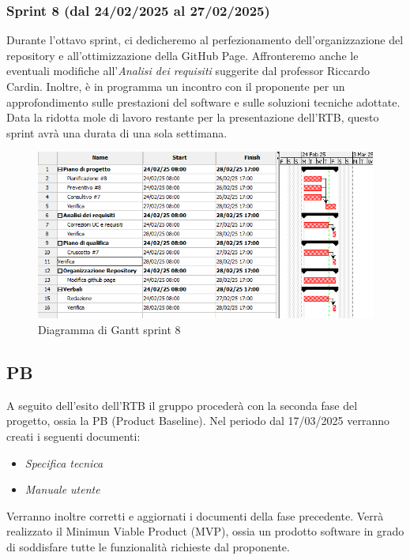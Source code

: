\subsubsection{Sprint 8 (dal 24/02/2025 al 27/02/2025)}
Durante l'ottavo sprint, ci dedicheremo al perfezionamento dell'organizzazione del repository e all'ottimizzazione della GitHub Page.
Affronteremo anche le eventuali modifiche all'\textit{Analisi dei requisiti} suggerite dal professor Riccardo Cardin.
Inoltre, è in programma un incontro con il proponente per un approfondimento sulle prestazioni del software e sulle soluzioni tecniche adottate.
Data la ridotta mole di lavoro restante per la presentazione dell'RTB, questo sprint avrà una durata di una sola settimana.

\begin{figure}[h!]
    \centering
    \includegraphics[scale = 0.7]{template/images/gantt8.png}
    \caption{Diagramma di Gantt sprint 8}
    \label{fig:3.8} %
\end{figure}

\subsection{PB}
A seguito dell'esito dell'RTB il gruppo procederà con la seconda fase del progetto, ossia la PB (Product Baseline).
Nel periodo dal 17/03/2025 verranno creati i seguenti documenti:
\begin{itemize}
    \item \textit{Specifica tecnica}
    \item \textit{Manuale utente}
\end{itemize}
Verranno inoltre corretti e aggiornati i documenti della fase precedente.
Verrà realizzato il Minimun Viable Product (MVP), ossia un prodotto software in grado di soddisfare tutte le funzionalità richieste dal proponente.

